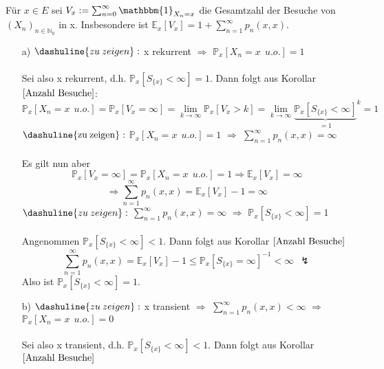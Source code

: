 Für $x \in E$ sei $V_{x} := \sum_{n=0}^{\infty} \mathbbm{1}_{X_{n} = x}$ die Gesamtzahl der Besuche von $(X_{n})_{n \in \mathbb{N}_{0}}$ in x. Insbesondere ist $\mathbb{E}_{x}[V_{x}] = 1 + \sum_{n=1}^{\infty} p_{n}(x,x)$.
\begin{itemize}
\item[a)] $\dashuline{zu \: zeigen}:$ x rekurrent $\Rightarrow$ $\mathbb{P}_{x}[X_{n} = x \: \: u.o.] = 1$
\\
\\
Sei also x rekurrent, d.h. $\mathbb{P}_{x}[S_{\lbrace x \rbrace} < \infty] = 1$. Dann folgt aus Korollar $\ref{Anzahl Besuche}$:
\begin{equation*}
\mathbb{P}_{x}[X_{n} = x \: \: u.o.] = \mathbb{P}_{x}[V_{x} = \infty] = \lim_{k \to \infty} \mathbb{P}_{x}[V_{x} > k] = \lim_{k \to \infty} {\underbrace{\mathbb{P}_{x}[S_{\lbrace x \rbrace} < \infty]}_{=1}}^{k} = 1 
\end{equation*}
$\mathrm{\dashuline{zu \: zeigen}:}$ $\mathbb{P}_{x}[X_{n} = x \: \: u.o.] = 1$ $\Rightarrow$ $\sum_{n=1}^{\infty} p_{n}(x,x) = \infty$
\\
\\
Es gilt nun aber
\begin{equation*}
\mathbb{P}_{x}[V_{x} = \infty] = \mathbb{P}_{x}[X_{n} = x \: \: u.o.] = 1 \Rightarrow \mathbb{E}_{x}[V_{x}] = \infty 
\end{equation*}
\begin{equation*}
\Rightarrow \sum_{n=1}^{\infty} p_{n}(x,x) = \mathbb{E}_{x}[V_{x}] - 1 = \infty
\end{equation*}
$\dashuline{zu \: zeigen}:$ $\sum_{n=1}^{\infty} p_{n}(x,x) = \infty$ $\Rightarrow$ $\mathbb{P}_{x}[S_{\lbrace x \rbrace} < \infty] = 1$ 
\\
\\
Angenommen $\mathbb{P}_{x}[S_{\lbrace x \rbrace} < \infty] < 1$. Dann folgt aus Korollar $\ref{Anzahl Besuche}$
\begin{equation*}
\sum_{n=1}^{\infty} p_{n}(x,x) = \mathbb{E}_{x}[V_{x}] - 1 \leq \mathbb{P}_{x}[S_{\lbrace x \rbrace} = \infty]^{-1} < \infty \: \: \lightning
\end{equation*}
Also ist $\mathbb{P}_{x}[S_{\lbrace x \rbrace} < \infty] = 1$.
\item[b)] $\dashuline{zu \: zeigen}:$ x transient $\Rightarrow$ $\sum_{n=1}^{\infty} p_{n}(x,x) < \infty$ $\Rightarrow$ $\mathbb{P}_{x}[X_{n} = x \: \: u.o.] = 0$
\\
\\
Sei also x transient, d.h. $\mathbb{P}_{x}[S_{\lbrace x \rbrace} < \infty] < 1$. Dann folgt aus Korollar $\ref{Anzahl Besuche}$

\end{itemize}
